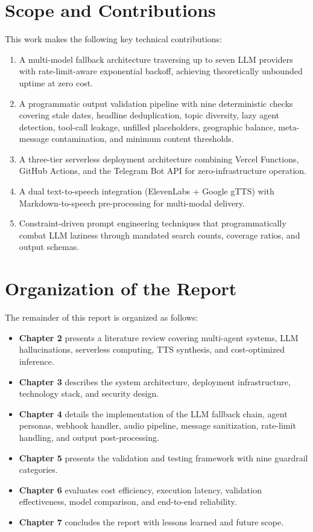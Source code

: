 \documentclass[12pt,a4paper]{report}
\begin{document}
\section{Scope and Contributions}
This work makes the following key technical contributions:
\begin{enumerate}
    \item A multi-model fallback architecture traversing up to seven LLM providers with rate-limit-aware exponential backoff, achieving theoretically unbounded uptime at zero cost.
    \item A programmatic output validation pipeline with nine deterministic checks covering stale dates, headline deduplication, topic diversity, lazy agent detection, tool-call leakage, unfilled placeholders, geographic balance, meta-message contamination, and minimum content thresholds.
    \item A three-tier serverless deployment architecture combining Vercel Functions, GitHub Actions, and the Telegram Bot API for zero-infrastructure operation.
    \item A dual text-to-speech integration (ElevenLabs + Google gTTS) with Markdown-to-speech pre-processing for multi-modal delivery.
    \item Constraint-driven prompt engineering techniques that programmatically combat LLM laziness through mandated search counts, coverage ratios, and output schemas.
\end{enumerate}

\section{Organization of the Report}
The remainder of this report is organized as follows:
\begin{itemize}
    \item \textbf{Chapter 2} presents a literature review covering multi-agent systems, LLM hallucinations, serverless computing, TTS synthesis, and cost-optimized inference.
    \item \textbf{Chapter 3} describes the system architecture, deployment infrastructure, technology stack, and security design.
    \item \textbf{Chapter 4} details the implementation of the LLM fallback chain, agent personas, webhook handler, audio pipeline, message sanitization, rate-limit handling, and output post-processing.
    \item \textbf{Chapter 5} presents the validation and testing framework with nine guardrail categories.
    \item \textbf{Chapter 6} evaluates cost efficiency, execution latency, validation effectiveness, model comparison, and end-to-end reliability.
    \item \textbf{Chapter 7} concludes the report with lessons learned and future scope.
\end{itemize}
\end{document}

